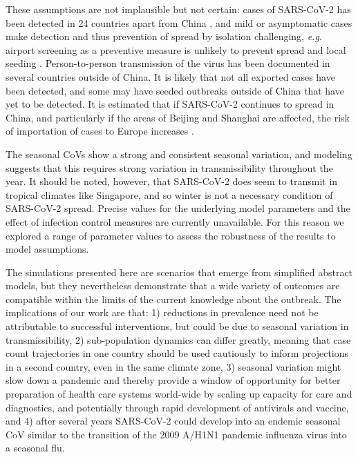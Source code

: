 \documentclass[rmp, reprint, superscriptaddress, floatfix,amsmath]{revtex4-1}
\begin{document}
These assumptions are not implausible but not certain: cases of SARS-CoV-2 has been detected in 24 countries apart from China \citep{WHO_situation_report23}, and mild or asymptomatic cases make detection and thus prevention of spread by isolation challenging, \textit{e.g.} airport screening as a preventive measure is unlikely to prevent spread and local seeding \citep{quilty2020effectiveness}. 
Person-to-person transmission of the virus has been documented in several countries outside of China. 
It is likely that not all exported cases have been detected, and some may have seeded outbreaks outside of China that have yet to be detected. It is estimated that if SARS-CoV-2 continues to spread in China, and particularly if the areas of Beijing and Shanghai are affected, the risk of importation of cases to Europe increases \citep{pullano2020novel}.

The seasonal CoVs show a strong and consistent seasonal variation, and modeling suggests that this requires strong variation in transmissibility throughout the year.
It should be noted, however, that SARS-CoV-2 does seem to transmit in tropical climates like Singapore, and so winter is not a necessary condition of SARS-CoV-2 spread. 
Precise values for the underlying model parameters and the effect of infection control measures are currently unavailable. For this reason we explored a range of parameter values to assess the robustness of the results to model assumptions.


The simulations presented here are scenarios that emerge from simplified abstract models, but they nevertheless demonstrate that a wide variety of outcomes are compatible within the limits of the current knowledge about the outbreak. 
The implications of our work are that: 1) reductions in prevalence need not be attributable to successful interventions, but could be due to seasonal variation in transmissibility, 2) sub-population dynamics can differ greatly, meaning that case count trajectories in one country should be used cautiously to inform projections in a second country, even in the same climate zone, 3) seasonal variation might slow down a pandemic and thereby provide a window of opportunity for better preparation of health care systems world-wide by scaling up capacity for care and diagnostics, and potentially through rapid development of antivirals and vaccine, and 4) after several years SARS-CoV-2 could develop into an endemic seasonal CoV similar to the transition of the 2009 A/H1N1 pandemic influenza virus into a seasonal flu.
\end{document}
